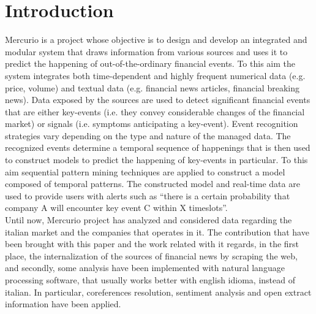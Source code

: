 \section{Introduction}
Mercurio is a project whose objective is to design and develop an integrated and modular system that draws information from various sources and uses it to predict the happening of out-of-the-ordinary financial events. To this aim the system integrates both time-dependent and highly frequent numerical data (e.g. price, volume) and textual data (e.g. financial news articles, financial breaking news).
Data exposed by the sources are used to detect significant financial events that are either key-events (i.e. they convey considerable changes of the financial market) or signals (i.e. symptoms anticipating a key-event). Event recognition strategies vary depending on the type and nature of the managed data. The recognized events determine a temporal sequence of happenings that is then used to construct models to predict the happening of key-events in particular. To this aim sequential pattern mining techniques are applied to construct a model composed of temporal patterns. The constructed model and real-time data are used to provide users with alerts such as “there is a certain probability that company A will encounter key event C within X timeslots”. \\
Until now, Mercurio project has analyzed and considered data regarding the italian market and the companies that operates in it. The contribution that have been brought with this paper and the work related with it regards, in the first place, the internalization of the sources of financial news by scraping the web, and secondly, some analysis have been implemented with natural language processing software, that usually works better with english idioma, instead of italian. In particular, coreferences resolution, sentiment analysis and open extract information have been applied. \\